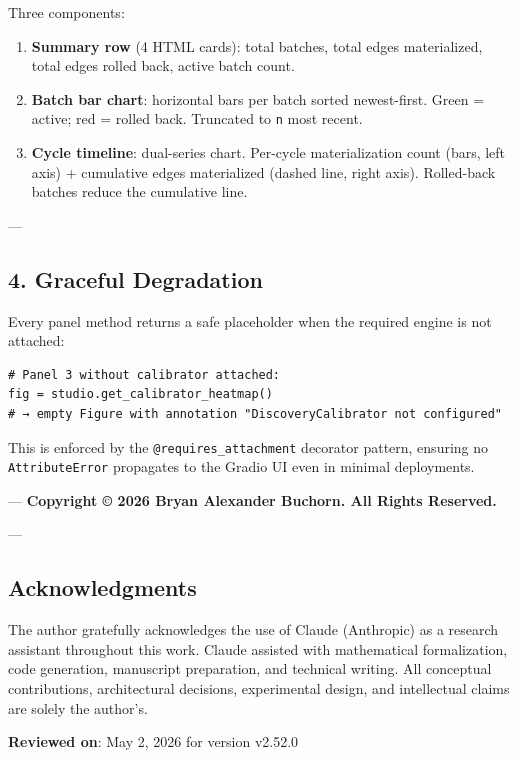 Three components:
\begin{enumerate}
\item \textbf{Summary row} (4 HTML cards): total batches, total edges mater\-ialized, total edges rolled back, active batch count.
\item \textbf{Batch bar chart}: horizontal bars per batch sorted newest-first. Green = active; red = rolled back. Truncated to \texttt{n} most recent.
\item \textbf{Cycle timeline}: dual-series chart. Per-cycle mater\-ialization count (bars, left axis) + cumulative edges mater\-ialized (dashed line, right axis). Rolled-back batches reduce the cumulative line.

\end{enumerate}
---

\subsection{4. Graceful Degradation}

Every panel method returns a safe placeholder when the required engine is not attached:

\begin{lstlisting}
# Panel 3 without calibrator attached:
fig = studio.get_calibrator_heatmap()
# → empty Figure with annotation "DiscoveryCalibrator not configured"
\end{lstlisting}

This is enforced by the \texttt{@requires\_attachment} decorator pattern, ensuring no \texttt{AttributeError} propagates to the Gradio UI even in minimal deployments.

---
\textbf{Copyright © 2026 Bryan Alexander Buchorn. All Rights Reserved.}

---
\subsection{Acknow\-ledgments}

The author gratefully ackno\-wledges the use of Claude (Anthropic) as a research assistant throughout this work. Claude assisted with mathe\-matical forma\-lization, code generation, manuscript preparation, and technical writing. All conceptual contr\-ibutions, archi\-tectural decisions, exper\-imental design, and intel\-lectual claims are solely the author's.

\textbf{Reviewed on}: May 2, 2026 for version v2.52.0
